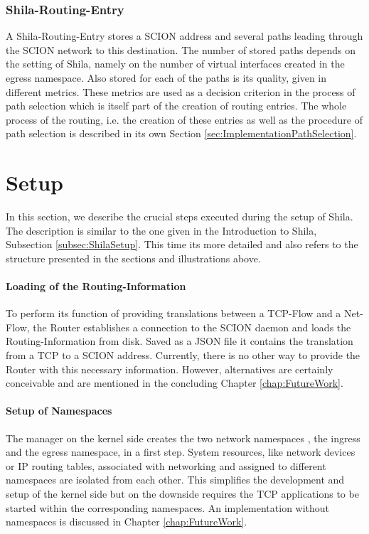 \subsubsection{Shila-Routing-Entry}

A Shila-Routing-Entry stores a SCION address and several paths leading through the SCION network to this destination. The number of stored paths depends on the setting of Shila, namely on the number of virtual interfaces created in the egress namespace. Also stored for each of the paths is its quality, given in different metrics. These metrics are used as a decision criterion in the process of path selection which is itself part of the creation of routing entries. The whole process of the routing, i.e. the creation of these entries as well as the procedure of path selection is described in its own Section \ref{sec:ImplementationPathSelection}.

\newpage
\section{Setup}
\label{sec:ImplementationSetup}

In this section, we describe the crucial steps executed during the setup of Shila. The description is similar to the one given in the Introduction to Shila, Subsection \ref{subsec:ShilaSetup}. This time its more detailed and also refers to the structure presented in the sections and illustrations above.

\paragraph{Loading of the Routing-Information}

To perform its function of providing translations between a TCP-Flow and a Net-Flow, the Router establishes a connection to the SCION daemon and loads the Routing-Information from disk. Saved as a JSON file it contains the translation from a TCP to a SCION address. Currently, there is no other way to provide the Router with this necessary information. However, alternatives are certainly conceivable and are mentioned in the concluding Chapter \ref{chap:FutureWork}.

\paragraph{Setup of Namespaces}

The manager on the kernel side creates the two network namespaces \cite{LinuxNetworkNamespacesUbuntuManual,LinuxNetworkNamespacesIntroduction}, the ingress and the egress namespace, in a first step. System resources, like network devices or IP routing tables, associated with networking and assigned to different namespaces are isolated from each other. This simplifies the development and setup of the kernel side but on the downside requires the TCP applications to be started within the corresponding namespaces. An implementation without namespaces is discussed in Chapter \ref{chap:FutureWork}.

